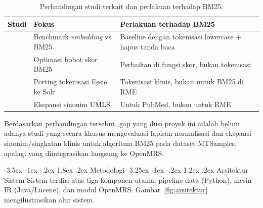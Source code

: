 \documentclass[a4paper,12pt]{article}
\makeatletter
\renewcommand{\section}{\@startsection{section}{1}{\z@}%
  {-3.5ex \@plus -1ex \@minus -.2ex}%
  {1.8ex \@plus .2ex}%
  {\normalfont\normalsize\bfseries}}
\renewcommand{\subsection}{\@startsection{subsection}{2}{\z@}%
  {-3.25ex \@plus -1ex \@minus -.2ex}%
  {1.2ex \@plus .2ex}%
  {\normalfont\normalsize\bfseries}}
\makeatother
\begin{document}
\begin{table}[h]
  \centering
  \caption{Perbandingan studi terkait dan perlakuan terhadap BM25.}
  \label{tab:gap}
  \begin{tabular}{|>{\raggedright\arraybackslash}p{3.5cm}|>{\raggedright\arraybackslash}p{4.6cm}|>{\raggedright\arraybackslash}p{4.2cm}|}
    \hline
    \textbf{Studi} & \textbf{Fokus} & \textbf{Perlakuan terhadap BM25} \\
    \hline
    \citet{mikkelsen2026clinical} & Benchmark \textit{embedding} vs BM25 & Baseline dengan tokenisasi lowercase + hapus tanda baca \\
    \hline
    \citet{zhang2021improved} & Optimasi bobot skor BM25 & Perbaikan di fungsi skor, bukan tokenisasi \\
    \hline
    \citet{gayen2023essie} & Porting tokenisasi Essie ke Solr & Tokenisasi klinis, bukan untuk BM25 di RME \\
    \hline
    \citet{griffon2012umls} & Ekspansi sinonim UMLS & Untuk PubMed, bukan untuk RME \\
    \hline
  \end{tabular}
\end{table}

Berdasarkan perbandingan tersebut, gap yang diisi proyek ini adalah belum adanya studi yang secara khusus mengevaluasi lapisan normalisasi dan ekspansi sinonim/singkatan klinis untuk algoritma BM25 pada dataset MTSamples, apalagi yang diintegrasikan langsung ke OpenMRS.

\section{Metodologi}
\subsection{Arsitektur Sistem}
Sistem terdiri atas tiga komponen utama: pipeline data (Python), mesin IR (Java/Lucene), dan modul OpenMRS. Gambar~\ref{fig:arsitektur} mengilustrasikan alur sistem.
\end{document}
